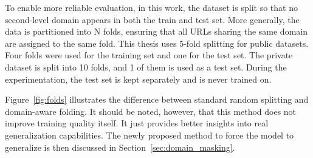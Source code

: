 \begin{table}[H]
    \centering
    \renewcommand{\arraystretch}{1.2}
    \caption{Distribution of second-level domains by label purity. "Mixed Labels" indicates domains that contain both benign and malicious URLs. For Kaggle Multiple, everything non-benign is considered malicious.}
    \label{tab:sld_label_distribution}
\end{table}

To enable more reliable evaluation, in this work, the dataset is split so that no second-level domain appears in both the train and test set. More generally, the data is partitioned into N folds, ensuring that all URLs sharing the same domain are assigned to the same fold. This thesis uses 5-fold splitting for public datasets. Four folds were used for the training set and one for the test set. The private dataset is split into 10 folds, and 1 of them is used as a test set. During the experimentation, the test set is kept separately and is never trained on.

Figure~\ref{fig:folds} illustrates the difference between standard random splitting and domain-aware folding. It should be noted, however, that this method does not improve training quality itself. It just provides better insights into real generalization capabilities. The newly proposed method to force the model to generalize is then discussed in Section~\ref{sec:domain_masking}.

